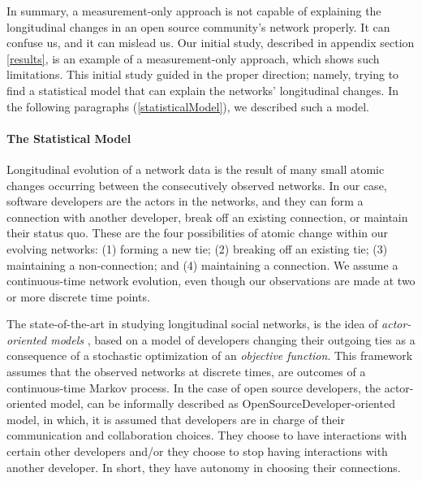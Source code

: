 \documentclass[12pt]{report}
\begin{document}
In summary, a measurement-only approach is not capable of explaining the longitudinal changes in an open source community's network properly. It can confuse us, and it can mislead us. Our initial study, described in appendix section \ref{results}, is an example of a measurement-only approach, which shows such limitations. This initial study guided in the proper direction; namely, trying to find a statistical model that can explain the networks' longitudinal changes. In the following paragraphs (\ref{statisticalModel}), we described such a model.  

%

\paragraph*{The Statistical Model}
\label{statisticalModel}

Longitudinal evolution of a network data is the result of many small atomic changes occurring between the consecutively observed networks. In our case, software developers are the actors in the networks, and they can form a connection with another developer, break off an existing connection, or maintain their status quo. These are the four possibilities of atomic change within our evolving networks: (1) forming a new tie; (2) breaking off an existing tie; (3) maintaining a non-connection; and (4) maintaining a connection. We assume a continuous-time network evolution, even though our observations are made at two or more discrete time points. 

The state-of-the-art in studying longitudinal social networks, is the idea of \textit{actor-oriented models} \cite{Snijders2010}, based on a model of developers changing their outgoing ties as a consequence of a stochastic optimization of an \textit{objective function}. This framework assumes that the observed networks at discrete times, are outcomes of a continuous-time Markov process. In the case of open source developers, the actor-oriented model, can be informally described as OpenSourceDeveloper-oriented model, in which, it is assumed that developers are in charge of their communication and collaboration choices. They choose to have interactions with certain other developers and/or they choose to stop having interactions with another developer. In short, they have autonomy in choosing their connections.
\end{document}
